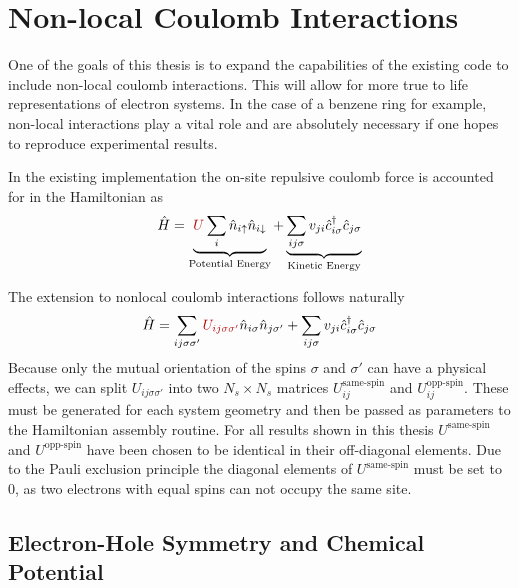 \section{Non-local Coulomb Interactions} \label{sec:non_local_coulomb}

One of the goals of this thesis is to expand the capabilities of the existing code to include non-local coulomb interactions. This will allow for more true to life representations of electron systems. In the case of a benzene ring for example, non-local interactions play a vital role and are absolutely necessary if one hopes to reproduce experimental results. 

\bigskip

In the existing implementation the on-site repulsive coulomb force is accounted for in the Hamiltonian as
\begin{equation}
    \hat{H}=\underbrace{{\color{red!70!black} U} \sum_{i} \hat{n}_{i \uparrow} \hat{n}_{i \downarrow}}_{\text{Potential Energy}}+%
    \underbrace{\sum_{i j \sigma} v_{j i} \hat{c}_{i \sigma}^{\dagger} \hat{c}_{j \sigma}}_{\text{Kinetic Energy}}\label{eq:local_ham_nonsym}
\end{equation}

 The extension to nonlocal coulomb interactions follows naturally
 \begin{equation}
    \hat{H}= \sum_{ij\sigma\sigma'}{\color{red!70!black} U_{ij\sigma\sigma'}}\hat{n}_{i \sigma} \hat{n}_{j\sigma'}+%
    \sum_{i j \sigma} v_{j i} \hat{c}_{i \sigma}^{\dagger} \hat{c}_{j \sigma}%
    \label{eq:ham_nonsym}
\end{equation}
Because only the mutual orientation of the spins $\sigma$ and $\sigma'$ can have a physical effects, we can split $U_{ij\sigma\sigma'}$ into two $N_s\times N_s$ matrices $U_{ij}^{\text{same-spin}}$ and $U_{ij}^{\text{opp-spin}}$. These must be generated for each system geometry and then be passed as parameters to the Hamiltonian assembly routine. For all results shown in this thesis $U^{\text{same-spin}}$ and $U^{\text{opp-spin}}$ have been chosen to be identical in their off-diagonal elements. Due to the Pauli exclusion principle the diagonal elements of $U^{\text{same-spin}}$ must be set to $0$, as two electrons with equal spins can not occupy the same site.


\subsection{Electron-Hole Symmetry and Chemical Potential}
